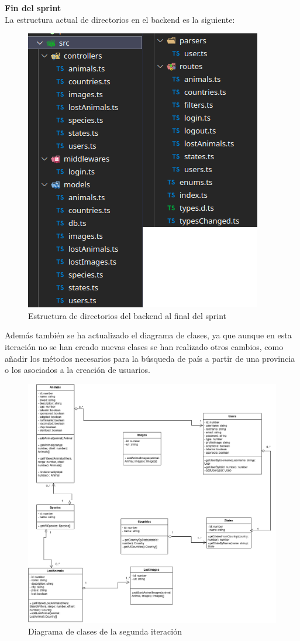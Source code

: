 \Large{\textbf{Fin del sprint}} \\

La estructura actual de directorios en el backend es la siguiente: 

\begin{figure}[H]
	\centering
	\includegraphics[width=0.7\linewidth]{"sprint 2/directoriosBackS2"}
	\caption{Estructura de directorios del backend al final del sprint}
	\label{fig:directoriosbacks2}
\end{figure}

Además también se ha actualizado el diagrama de clases, ya que aunque en esta iteración no se han creado nuevas clases se han realizado otros cambios, como añadir los métodos necesarios para la búsqueda de país a partir de una provincia o los asociados a la creación de usuarios.

\begin{figure}[H]
	\centering
	\includegraphics[width=1\linewidth]{"sprint 2/clases"}
	\caption{Diagrama de clases de la segunda iteración}
	\label{fig:clases2}
\end{figure}


